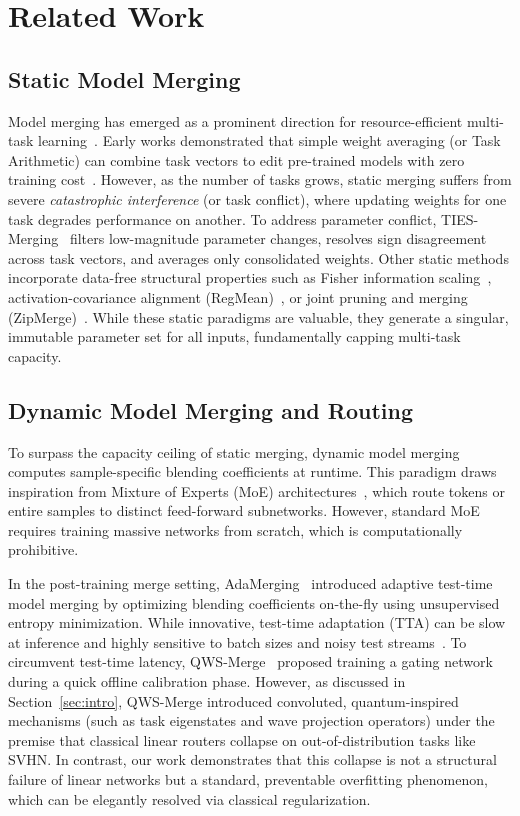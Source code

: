 \section{Related Work}
\label{sec:related}

\subsection{Static Model Merging}
Model merging has emerged as a prominent direction for resource-efficient multi-task learning~\cite{Wortsman2022}. Early works demonstrated that simple weight averaging (or Task Arithmetic) can combine task vectors to edit pre-trained models with zero training cost~\cite{Ilharco2022}. However, as the number of tasks grows, static merging suffers from severe \emph{catastrophic interference} (or task conflict), where updating weights for one task degrades performance on another. To address parameter conflict, TIES-Merging~\cite{Yadav2023} filters low-magnitude parameter changes, resolves sign disagreement across task vectors, and averages only consolidated weights. Other static methods incorporate data-free structural properties such as Fisher information scaling~\cite{Matena2022}, activation-covariance alignment (RegMean)~\cite{jin2022dataless}, or joint pruning and merging (ZipMerge)~\cite{ZipMerge2025}. While these static paradigms are valuable, they generate a singular, immutable parameter set for all inputs, fundamentally capping multi-task capacity.

\subsection{Dynamic Model Merging and Routing}
To surpass the capacity ceiling of static merging, dynamic model merging computes sample-specific blending coefficients at runtime. This paradigm draws inspiration from Mixture of Experts (MoE) architectures~\cite{shazeer2017outrageously, fedus2022switch}, which route tokens or entire samples to distinct feed-forward subnetworks. However, standard MoE requires training massive networks from scratch, which is computationally prohibitive. 

In the post-training merge setting, AdaMerging~\cite{AdaMerging2023} introduced adaptive test-time model merging by optimizing blending coefficients on-the-fly using unsupervised entropy minimization. While innovative, test-time adaptation (TTA) can be slow at inference and highly sensitive to batch sizes and noisy test streams~\cite{liao2021are, OFS2025}. To circumvent test-time latency, QWS-Merge~\cite{vance2025quantum} proposed training a gating network during a quick offline calibration phase. However, as discussed in Section~\ref{sec:intro}, QWS-Merge introduced convoluted, quantum-inspired mechanisms (such as task eigenstates and wave projection operators) under the premise that classical linear routers collapse on out-of-distribution tasks like SVHN. In contrast, our work demonstrates that this collapse is not a structural failure of linear networks but a standard, preventable overfitting phenomenon, which can be elegantly resolved via classical regularization.

